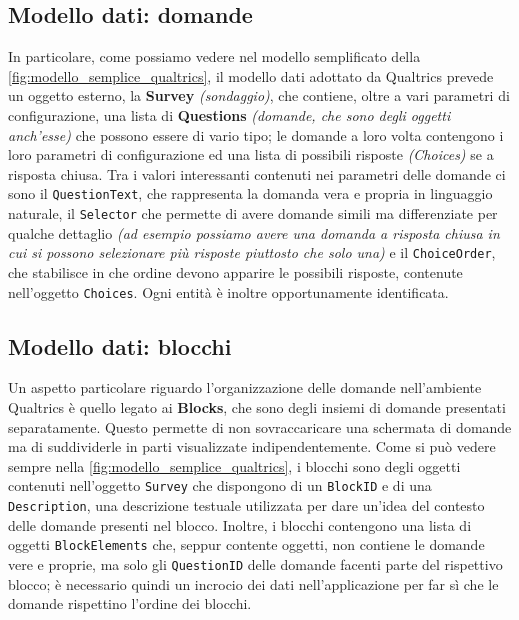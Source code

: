 \subsection{Modello dati: domande}
In particolare, come possiamo vedere nel modello semplificato della \autoref{fig:modello_semplice_qualtrics}, il modello dati adottato da Qualtrics prevede un oggetto esterno, la \textbf{Survey} \textit{(sondaggio)}, che contiene, oltre a vari parametri di configurazione, una lista di \textbf{Questions} \textit{(domande, che sono degli oggetti anch'esse)} che possono essere di vario tipo; le domande a loro volta contengono i loro parametri di configurazione ed una lista di possibili risposte \textit{(Choices)} se a risposta chiusa.
Tra i valori interessanti contenuti nei parametri delle domande ci sono il \texttt{QuestionText}, che rappresenta la domanda vera e propria in linguaggio naturale, il \texttt{Selector} che permette di avere domande simili ma differenziate per qualche dettaglio \textit{(ad esempio possiamo avere una domanda a risposta chiusa in cui si possono selezionare più risposte piuttosto che solo una)} e il \texttt{ChoiceOrder}, che stabilisce in che ordine devono apparire le possibili risposte, contenute nell'oggetto \texttt{Choices}.
Ogni entità è inoltre opportunamente identificata.

\newpage

\subsection{Modello dati: blocchi}
\label{subsection:blocchi}
Un aspetto particolare riguardo l'organizzazione delle domande nell'ambiente Qualtrics è quello legato ai \textbf{Blocks}, che sono degli insiemi di domande presentati separatamente. Questo permette di non sovraccaricare una schermata di domande ma di suddividerle in parti visualizzate indipendentemente.
Come si può vedere sempre nella \autoref{fig:modello_semplice_qualtrics}, i blocchi sono degli oggetti contenuti nell'oggetto \texttt{Survey} che dispongono di un \texttt{BlockID} e di una \texttt{Description}, una descrizione testuale utilizzata per dare un'idea del contesto delle domande presenti nel blocco. Inoltre, i blocchi contengono una lista di oggetti \texttt{BlockElements} che, seppur contente oggetti, non contiene le domande vere e proprie, ma solo gli \texttt{QuestionID} delle domande facenti parte del rispettivo blocco; è necessario quindi un incrocio dei dati nell'applicazione per far sì che le domande rispettino l'ordine dei blocchi.

